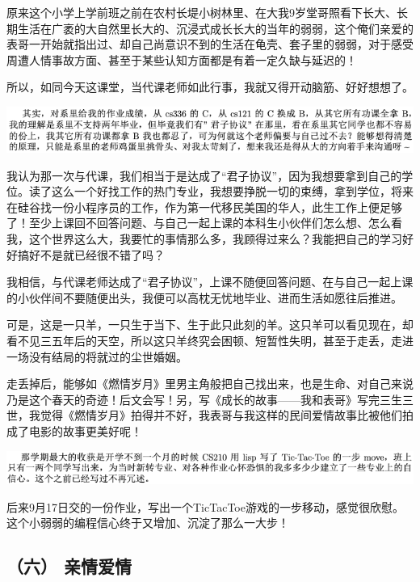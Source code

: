 \documentclass[9pt, b5paper]{article}
\begin{document}
原来这个小学上学前班之前在农村长堤小树林里、在大我9岁堂哥照看下长大、长期生活在广袤的大自然里长大的、沉浸式成长长大的当年的弱弱，这个俺们亲爱的表哥一开始就指出过、却自己尚意识不到的生活在龟壳、套子里的弱弱，对于感受周遭人情事故方面、甚至于某些认知方面都是有着一定久缺与延迟的！

所以，如同今天这课堂，当代课老师如此行事，我就又得开动脑筋、好好想想了。

\begin{center}
\includegraphics[width=.9\linewidth]{./pic/backups_plans_20210425_154431.png}
\end{center}

我认为那一次与代课，我们相当于是达成了“君子协议”，因为我想要拿到自己的学位。读了这么一个好找工作的热门专业，我想要挣脱一切的束缚，拿到学位，将来在硅谷找一份小程序员的工作，作为第一代移民美国的华人，此生工作上便足够了！至少上课回不回答问题、与自己一起上课的本科生小伙伴们怎么想、怎么看我，这个世界这么大，我要忙的事情那么多，我顾得过来么？我能把自己的学习好好搞好不是就已经很不错了吗？

我相信，与代课老师达成了“君子协议”，上课不随便回答问题、在与自己一起上课的小伙伴间不要随便出头，我便可以高枕无忧地毕业、进而生活如愿往后推进。

可是，这是一只羊，一只生于当下、生于此只此刻的羊。这只羊可以看见现在，却看不见三五年后的天空，所以这只羊终究会困顿、短暂性失明，甚至于走丢，走进一场没有结局的将就过的尘世婚姻。

走丢掉后，能够如《燃情岁月》里男主角般把自己找出来，也是生命、对自己来说乃是这个春天的奇迹！后文会写！另，写《成长的故事——我和表哥》写完三生三世，我觉得《燃情岁月》拍得并不好，我表哥与我这样的民间爱情故事比被他们拍成了电影的故事更美好呢！

\begin{center}
\includegraphics[width=.9\linewidth]{./pic/backups_plans_20210424_205732.png}
\end{center}

后来9月17日交的一份作业，写出一个TicTacToe游戏的一步移动，感觉很欣慰。这个小弱弱的编程信心终于又增加、沉淀了那么一大步！

\subsection{（六） 亲情爱情}
\label{sec:org642a51a}
\end{document}
